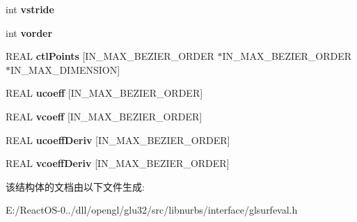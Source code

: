 \begin{DoxyCompactItemize}
int {\bfseries vstride}
\item 
\mbox{\label{structsurf_eval_machine_a1c222ab3f2f694334592dbb5942d5d63}} 
int {\bfseries vorder}
\item 
\mbox{\label{structsurf_eval_machine_ade423853db7c03ac2d010112a196ac01}} 
R\+E\+AL {\bfseries ctl\+Points} \mbox{[}I\+N\+\_\+\+M\+A\+X\+\_\+\+B\+E\+Z\+I\+E\+R\+\_\+\+O\+R\+D\+ER $\ast$I\+N\+\_\+\+M\+A\+X\+\_\+\+B\+E\+Z\+I\+E\+R\+\_\+\+O\+R\+D\+ER $\ast$I\+N\+\_\+\+M\+A\+X\+\_\+\+D\+I\+M\+E\+N\+S\+I\+ON\mbox{]}
\item 
\mbox{\label{structsurf_eval_machine_a469d515d521c75635d9ddef671aca1ad}} 
R\+E\+AL {\bfseries ucoeff} \mbox{[}I\+N\+\_\+\+M\+A\+X\+\_\+\+B\+E\+Z\+I\+E\+R\+\_\+\+O\+R\+D\+ER\mbox{]}
\item 
\mbox{\label{structsurf_eval_machine_a76b74d1c1144b5a21637ae9262824c05}} 
R\+E\+AL {\bfseries vcoeff} \mbox{[}I\+N\+\_\+\+M\+A\+X\+\_\+\+B\+E\+Z\+I\+E\+R\+\_\+\+O\+R\+D\+ER\mbox{]}
\item 
\mbox{\label{structsurf_eval_machine_a461947cec77bc229dc3fcc3133097b4d}} 
R\+E\+AL {\bfseries ucoeff\+Deriv} \mbox{[}I\+N\+\_\+\+M\+A\+X\+\_\+\+B\+E\+Z\+I\+E\+R\+\_\+\+O\+R\+D\+ER\mbox{]}
\item 
\mbox{\label{structsurf_eval_machine_abb2be40753668b494c73ada55db65c14}} 
R\+E\+AL {\bfseries vcoeff\+Deriv} \mbox{[}I\+N\+\_\+\+M\+A\+X\+\_\+\+B\+E\+Z\+I\+E\+R\+\_\+\+O\+R\+D\+ER\mbox{]}
\end{DoxyCompactItemize}


该结构体的文档由以下文件生成\+:\begin{DoxyCompactItemize}
\item 
E\+:/\+React\+O\+S-\/0../dll/opengl/glu32/src/libnurbs/interface/glsurfeval.\+h\end{DoxyCompactItemize}
